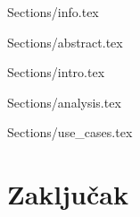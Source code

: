 \documentclass[a4paper]{article}
\begin{document}
 {Sections/info.tex}
\maketitle

 {Sections/abstract.tex}

\tableofcontents

\newpage

 {Sections/intro.tex}

 {Sections/analysis.tex}

 {Sections/use_cases.tex}


\section{Zaključak}
\label{sec:zakljucak}


\appendix
 

\end{document}
